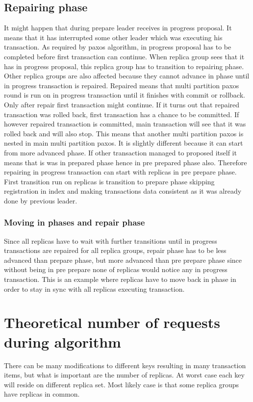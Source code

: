 \subsection{Repairing phase}
It might happen that during prepare leader receives in progress proposal. It means that it has interrupted some other leader which was executing his transaction. As required by paxos algorithm, in progress proposal has to be completed before first transaction can continue. When replica group sees that it has in progress proposal, this replica group has to transition to repairing phase. 
Other replica groups are also affected because they cannot advance in phase until in progress transaction is repaired. Repaired means that multi partition paxos round is run on in progress transaction until it finishes with commit or rollback. Only after repair first transaction might continue. If it turns out that repaired transaction was rolled back, first transaction has a chance to be committed. If however repaired transaction is committed, main transaction will see that it was rolled back and will also stop.
This means that another multi partition paxos is nested in main multi partition paxos. It is slightly different because it can start from more advanced phase.
If other transaction managed to proposed itself it means that is was in prepared phase hence in pre prepared phase also. Therefore repairing in progress transaction can start with replicas in pre prepare phase. First transition run on replicas is transition to prepare phase skipping registration in index and making transactions data consistent as it was already done by previous leader.


\subsubsection{Moving in phases and repair phase}
Since all replicas have to wait with further transitions until in progress transactions are repaired for all replica groups, repair phase has to be less advanced than prepare phase, but more advanced than pre prepare phase since without being in pre prepare none of replicas would notice any in progress transaction. This is an example where replicas have to move back in phase in order to stay in sync with all replicas executing transaction.




\section{Theoretical number of requests during algorithm}
There can be many modifications to different keys resulting in many transaction items, but what is important are the number of replicas. At worst case each key will reside on different replica set. Most likely case is that some replica groups have replicas in common.


